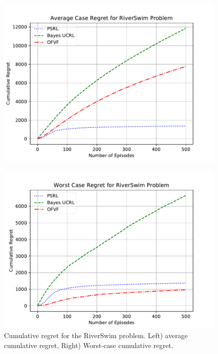 \documentclass{article}
\theoremstyle{plain}
\theoremstyle{definition}
\begin{document}
\begin{figure}
	\centering
	\begin{minipage}[c]{.85\columnwidth}
		\centering
		\includegraphics[width=\linewidth]{fig/RiverSwim_averagecase_Bayes_PSRL_OFVF.pdf}\\
	\end{minipage}%
	\begin{minipage}[c]{.85\columnwidth}
		\centering
		\includegraphics[width=\linewidth]{fig/RiverSwim_worstcase_Bayes_PSRL_OFVF.pdf}
	\end{minipage}%
	\caption{Cumulative regret for the RiverSwim problem. Left) average cumulative regret, Right) Worst-case cumulative regret.}
	\label{fig:riverswim}
\end{figure}
\end{document}
